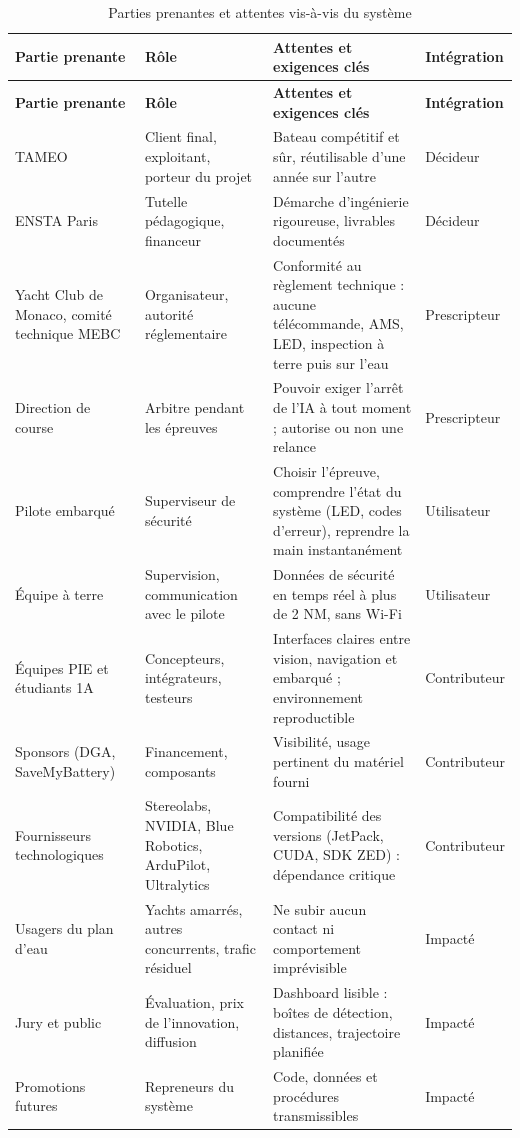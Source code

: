 \documentclass[11pt,letterpaper]{article}
\begin{document}
\begingroup
\footnotesize
{}
\begin{longtable}{L{3.0cm}L{3.5cm}L{5.3cm}L{2.2cm}}
\caption{Parties prenantes et attentes vis-à-vis du système}\label{tab:pp}\\
\toprule
\textbf{Partie prenante} & \textbf{Rôle} & \textbf{Attentes et exigences clés} & \textbf{Intégration} \\
\midrule
\endfirsthead
\toprule
\textbf{Partie prenante} & \textbf{Rôle} & \textbf{Attentes et exigences clés} & \textbf{Intégration} \\
\midrule
\endhead
TAMEO & Client final, exploitant, porteur du projet & Bateau compétitif et sûr, réutilisable d'une année sur l'autre & Décideur \\
ENSTA Paris & Tutelle pédagogique, financeur & Démarche d'ingénierie rigoureuse, livrables documentés & Décideur \\
Yacht Club de Monaco, comité technique MEBC & Organisateur, autorité réglementaire & Conformité au règlement technique : aucune télécommande, AMS, LED, inspection à terre puis sur l'eau & Prescripteur \\
Direction de course & Arbitre pendant les épreuves & Pouvoir exiger l'arrêt de l'IA à tout moment ; autorise ou non une relance & Prescripteur \\
Pilote embarqué & Superviseur de sécurité & Choisir l'épreuve, comprendre l'état du système (LED, codes d'erreur), reprendre la main instantanément & Utilisateur \\
Équipe à terre & Supervision, communication avec le pilote & Données de sécurité en temps réel à plus de 2 NM, sans Wi-Fi & Utilisateur \\
Équipes PIE et étudiants 1A & Concepteurs, intégrateurs, testeurs & Interfaces claires entre vision, navigation et embarqué ; environnement reproductible & Contributeur \\
Sponsors (DGA, SaveMyBattery) & Financement, composants & Visibilité, usage pertinent du matériel fourni & Contributeur \\
Fournisseurs technologiques & Stereolabs, NVIDIA, Blue Robotics, ArduPilot, Ultralytics & Compatibilité des versions (JetPack, CUDA, SDK ZED) : dépendance critique & Contributeur \\
Usagers du plan d'eau & Yachts amarrés, autres concurrents, trafic résiduel & Ne subir aucun contact ni comportement imprévisible & Impacté \\
Jury et public & Évaluation, prix de l'innovation, diffusion & Dashboard lisible : boîtes de détection, distances, trajectoire planifiée & Impacté \\
Promotions futures & Repreneurs du système & Code, données et procédures transmissibles & Impacté \\
\bottomrule
\end{longtable}
\endgroup
\end{document}
